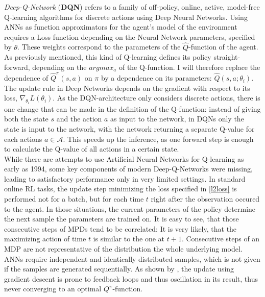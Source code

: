 \textit{Deep-Q-Network} (\textbf{DQN}) refers to a family of off-policy, online, active, model-free Q-learning algorithms for discrete actions using Deep Neural Networks. %
Using ANNs as function approximators for the agent's model of the environment requires a Loss function depending on the Neural Network parameters, specified by $\theta$. These weights correspond to the parameters of the $\hat{Q}$-function of the agent. As previously mentioned, this kind of Q-learning defines its policy straight-forward, depending on the $argmax_a$ of the Q-function. I will therefore replace the dependence of $\hat{Q}^\pi(s,a)$ on $\pi$ by a dependence on its parameters: $\hat{Q}(s,a;\theta_i)$. The update rule in Deep Networks depends on the gradient with respect to its loss, $\nabla_{\theta_i}L(\theta_i)$.  %
As the DQN-architecture only considers discrete actions, there is one change that can be made in the definition of the Q-function: instead of giving both the state $s$ and the action $a$ as input to the network, in DQNs only the state is input to the network, with the network returning a separate Q-value for each actions $a \in \mathcal{A}$. This speeds up the inference, as one forward step is enough to calculate the Q-value of all actions in a certain state.\\

\noindent While there are attempts to use Artificial Neural Networks for Q-learning as early as 1994\cite{rummery_-line_1994}, some key components of modern Deep-Q-Networks were missing, leading to satisfactory performance only in very limited settings. In standard online RL tasks, the update step minimizing the loss specified in \ref{l2loss} is performed not for a batch, but for each time $t$ right after the observation occured to the agent. 
In those situations, the current parameters of the policy determine the next sample the parameters are trained on. It is easy to see, that those consecutive steps of MPDs tend to be correlated: It is very likely, that the maximizing action of time $t$ is similar to the one at $t+1$. Consecutive steps of an MDP are not representative of the distribution the whole underlying model. ANNs require independent and identically distributed samples, which is not given if the samples are generated sequentially. As shown by \cite{john_n._tsitsiklis_analysis_1997}, the update using gradient descent is prone to feedback loops and thus oscillation in its result, thus never converging to an optimal $Q^\pi$-function. 

